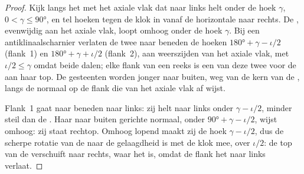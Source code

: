 \begin{proof}
Kijk langs het  met het axiale vlak dat naar links helt onder de hoek $\gamma$, $0 < \gamma \le \ang{90}$, en tel hoeken tegen de klok in vanaf de horizontale naar rechts. De , evenwijdig aan het axiale vlak, loopt omhoog onder de hoek $\gamma$. Bij een antiklinaalscharnier verlaten de twee  naar beneden de hoeken $\ang{180} + \gamma - \iota/2$ (flank~1) en $\ang{180} + \gamma + \iota/2$ (flank~2), aan weerszijden van het axiale vlak, met $\iota/2 \le \gamma$ omdat beide dalen; elke flank van een reeks  is een van deze twee voor de  aan haar top. De gesteenten worden jonger naar buiten, weg van de kern van de , langs de normaal op de flank die van het axiale vlak af wijst.

Flank~1 gaat naar beneden naar links: zij helt naar links onder $\gamma - \iota/2$, minder steil dan de . Haar naar buiten gerichte normaal, onder $\ang{90} + \gamma -
\iota/2$, wijst omhoog: zij staat rechtop. Omhoog lopend maakt zij de hoek $\gamma - \iota/2$, dus de scherpe rotatie van de  naar de gelaagdheid is met de klok mee, over $\iota/2$: de top van de  verschuift naar rechts, waar het  is, omdat de flank het  naar links verlaat.


\end{proof}
